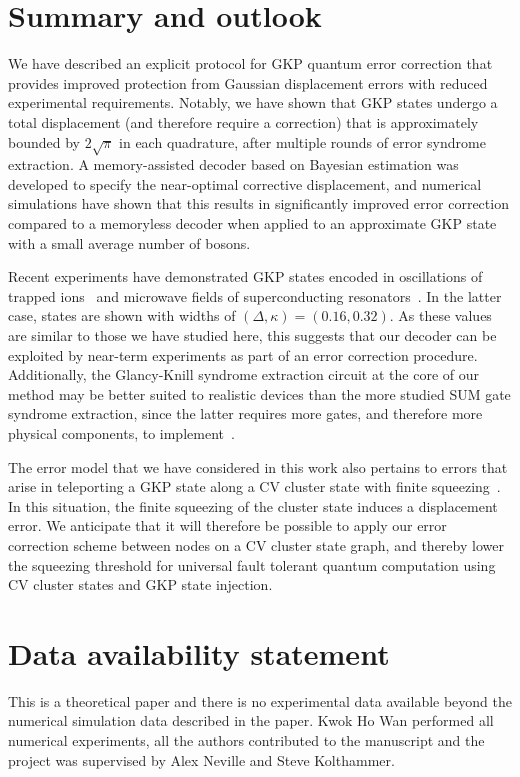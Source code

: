 \documentclass[prx,reprint,superscriptaddress,longbibliography,floatfix,nofootinbib]{revtex4-1}
\begin{document}
\section{Summary and outlook}
We have described an explicit protocol for GKP quantum error correction that provides improved protection from Gaussian displacement errors with reduced experimental requirements. Notably, we have shown that GKP states undergo a total displacement (and therefore require a correction) that is approximately bounded by $2\sqrt{\pi}$ in each quadrature, after multiple rounds of error syndrome extraction. A memory-assisted decoder based on Bayesian estimation was developed to specify the near-optimal corrective displacement, and numerical simulations have shown that this results in significantly improved error correction compared to a memoryless decoder when applied to an approximate GKP state with a small average number of bosons.

Recent experiments have demonstrated GKP states encoded in oscillations of trapped ions~\cite{Fluhmann2019} and microwave fields of superconducting resonators~\cite{2019arXiv190712487C}. In the latter case, states are shown with widths of $(\Delta, \kappa) = (0.16, 0.32)$. 
As these values are similar to those we have studied here, this suggests that our decoder can be exploited by near-term experiments as part of an error correction procedure. Additionally, the Glancy-Knill syndrome extraction circuit at the core of our method may be better suited to realistic devices than the more studied SUM gate syndrome extraction, since the latter requires more gates, and therefore more physical components, to implement~\cite{TBMSK2019}.

The error model that we have considered in this work  also pertains to errors that arise in teleporting a GKP state along a CV cluster state with finite squeezing~\cite{PhysRevA.79.062318}.
In this situation, the finite squeezing of the cluster state induces a displacement error. 
We anticipate that it will therefore be possible to apply our error correction scheme between nodes on a CV cluster state graph, and thereby lower the squeezing threshold for universal fault tolerant quantum computation using CV cluster states and GKP state injection.
\section*{Data availability statement}
This is a theoretical paper and there is no experimental data available beyond the numerical simulation data described in the paper. Kwok Ho Wan performed all numerical experiments, all the authors contributed to the manuscript and the project was supervised by Alex Neville and Steve Kolthammer.
\end{document}
